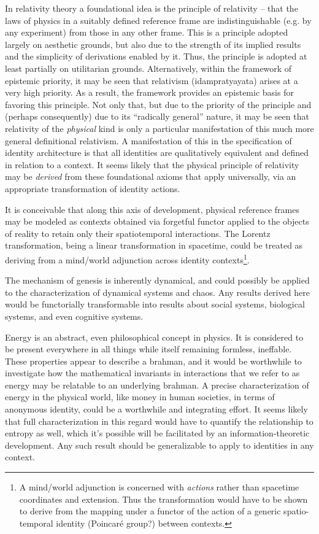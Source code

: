 \documentclass[pra,twocolumn,groupedaddress,10pt]{revtex4}
\theoremstyle{definition}
\begin{document}
In relativity theory a foundational idea is the principle of relativity -- that the laws of physics in a suitably defined reference frame are indistinguishable (e.g. by any experiment) from those in any other frame. This is a principle adopted largely on aesthetic grounds, but also due to the strength of its implied results and the simplicity of derivations enabled by it. Thus, the principle is adopted at least partially on utilitarian grounds. Alternatively, within the framework of epistemic priority, it may be seen that relativism (idampratyayata) arises at a very high priority. As a result, the framework provides an epistemic basis for favoring this principle. Not only that, but due to the priority of the principle and (perhaps consequently) due to its ``radically general'' nature, it may be seen that relativity of the \emph{physical} kind is only a particular manifestation of this much more general definitional relativism. A manifestation of this in the specification of identity architecture is that all identities are qualitatively equivalent and defined in relation to a context. It seems likely that the physical principle of relativity may be \emph{derived} from these foundational axioms that apply universally, via an appropriate transformation of identity actions.

It is conceivable that along this axis of development, physical reference frames may be modeled as contexts obtained via forgetful functor applied to the objects of reality to retain only their spatiotemporal interactions. The Lorentz transformation, being a linear transformation in spacetime, could be treated as deriving from a mind/world adjunction across identity contexts\footnote{A mind/world adjunction is concerned with \emph{actions} rather than spacetime coordinates and extension. Thus the transformation would have to be shown to derive from the mapping under a functor of the action of a generic spatio-temporal identity (Poincar\'{e} group?) between contexts.}.

The mechanism of genesis is inherently dynamical, and could possibly be applied to the characterization of dynamical systems and chaos. Any results derived here would be functorially transformable into results about social systems, biological systems, and even cognitive systems.

Energy is an abstract, even philosophical concept in physics. It is considered to be present everywhere in all things while itself remaining formless, ineffable. These properties appear to describe a brahman, and it would be worthwhile to investigate how the mathematical invariants in interactions that we refer to as energy may be relatable to an underlying brahman. A precise characterization of energy in the physical world, like money in human societies, in terms of anonymous identity, could be a worthwhile and integrating effort. It seems likely that full characterization in this regard would have to quantify the relationship to entropy as well, which it's possible will be facilitated by an information-theoretic development. Any such result should be generalizable to apply to identities in any context.
\end{document}
